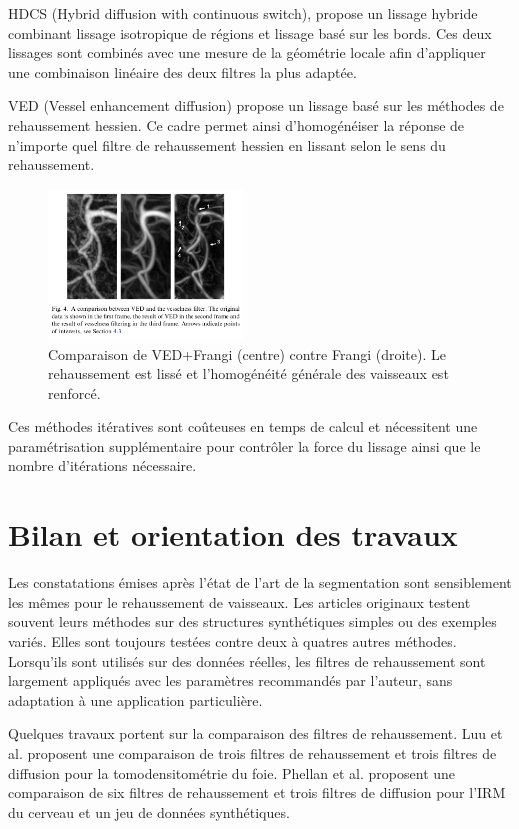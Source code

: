 HDCS \cite{Mendrik2009_HDCS} (Hybrid diffusion with continuous switch), propose un lissage hybride combinant lissage isotropique de régions et lissage basé sur les bords. Ces deux lissages sont combinés avec une mesure de la géométrie locale afin d'appliquer une combinaison linéaire des deux filtres la plus adaptée.

VED \cite{Manniesing2006_VED} (Vessel enhancement diffusion) propose un lissage basé sur les méthodes de rehaussement hessien. Ce cadre permet ainsi d'homogénéiser la réponse de n'importe quel filtre de rehaussement hessien en lissant selon le sens du rehaussement.

\begin{figure}[ht]
  \centering
  \includegraphics[height=4cm]{Images/VED.png}
  \caption{Comparaison de VED+Frangi (centre) contre Frangi (droite). Le rehaussement est lissé et l'homogénéité générale des vaisseaux est renforcé.}
  \label{fig:custom_fig}
\end{figure}

Ces méthodes itératives sont coûteuses en temps de calcul et nécessitent une paramétrisation supplémentaire pour contrôler la force du lissage ainsi que le nombre d'itérations nécessaire.

\section{Bilan et orientation des travaux}
\label{sec:EA:bilan}

Les constatations émises après l'état de l'art de la segmentation sont sensiblement les mêmes pour le rehaussement de vaisseaux. Les articles originaux testent souvent leurs méthodes sur des structures synthétiques simples ou des exemples variés. Elles sont toujours testées contre deux à quatres autres méthodes. Lorsqu'ils sont utilisés sur des données réelles, les filtres de rehaussement sont largement appliqués avec les paramètres recommandés par l'auteur, sans adaptation à une application particulière.

Quelques travaux portent sur la comparaison des filtres de rehaussement. Luu et al. \cite{Luu2015_liver_vesselness_comparison} proposent une comparaison de trois filtres de rehaussement et trois filtres de diffusion pour la tomodensitométrie du foie. Phellan et al. \cite{Phellan2017_Brain_vesselness_comparison} proposent une comparaison de six filtres de rehaussement et trois filtres de diffusion pour l'IRM du cerveau et un jeu de données synthétiques.

